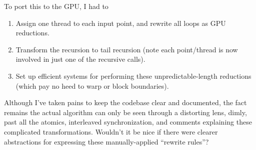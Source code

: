 To port this to the GPU, I had to
\begin{enumerate}
  \item Assign one thread to each input point, and rewrite all loops
  as GPU reductions.

  \item Transform the recursion to tail recursion (note each
  point/thread is now involved in just one of the recursive calls).

  \item Set up efficient systems for performing these
  unpredictable-length reductions (which pay no heed to warp or block
  boundaries).
\end{enumerate}

Although I've taken pains to keep the codebase clear and documented,
the fact remains the actual algorithm can only be seen through a
distorting lens, dimly, past all the atomics, interleaved
synchronization, and comments explaining these complicated
transformations.  Wouldn't it be nice if there were clearer
abstractions for expressing these manually-applied ``rewrite rules''?





